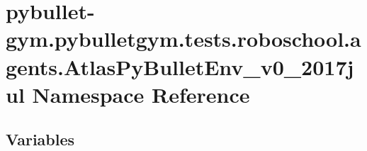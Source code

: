 \hypertarget{namespacepybullet-gym_1_1pybulletgym_1_1tests_1_1roboschool_1_1agents_1_1_atlas_py_bullet_env__v0__2017jul}{}\section{pybullet-\/gym.pybulletgym.\+tests.\+roboschool.\+agents.\+Atlas\+Py\+Bullet\+Env\+\_\+v0\+\_\+2017jul Namespace Reference}
\label{namespacepybullet-gym_1_1pybulletgym_1_1tests_1_1roboschool_1_1agents_1_1_atlas_py_bullet_env__v0__2017jul}
\subsection*{Variables}
